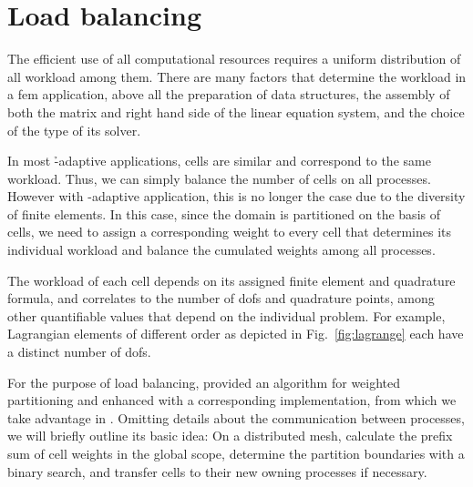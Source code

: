 \section{Load balancing}
\label{sec:balancing}

The efficient use of all computational resources requires a uniform distribution of all workload among them. There are many factors that determine the workload in a \gls{fem} application, above all the preparation of data structures, the assembly of both the matrix and right hand side of the linear equation system, and the choice of the type of its solver.

In most \h-adaptive applications, cells are similar and correspond to the same workload. Thus, we can simply balance the number of cells on all processes. However with \hp-adaptive application, this is no longer the case due to the diversity of finite elements. %
In this case, since the domain is partitioned on the basis of cells, we need to assign a corresponding weight to every cell that determines its individual workload and balance the cumulated weights among all processes.

The workload of each cell depends on its assigned finite element and quadrature formula, and correlates to the number of \glspl{dof} and quadrature points, among other quantifiable values that depend on the individual problem. For example, Lagrangian elements of different order as depicted in Fig.~\ref{fig:lagrange} each have a distinct number of \glspl{dof}.





For the purpose of load balancing, \textcite[Sec.~3.3]{burstedde2011} provided an algorithm for weighted partitioning and enhanced \pforest{} \textcite{p4est22} with a corresponding implementation, from which we take advantage in \dealii{}. Omitting details about the communication between processes, we will briefly outline its basic idea: On a distributed mesh, calculate the prefix sum of cell weights in the global scope, determine the partition boundaries with a binary search, and transfer cells to their new owning processes if necessary.

